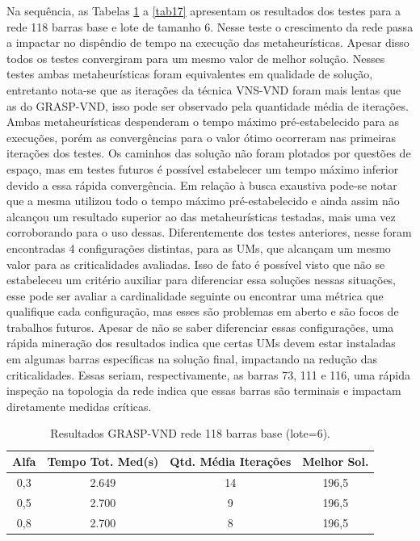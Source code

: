 \documentclass[12pt]{article}
\begin{document}
Na sequência, as Tabelas \ref{tab14} a \ref{tab17} apresentam os resultados dos testes para a rede 118 barras base e lote de tamanho 6. Nesse teste o crescimento da rede passa a impactar no dispêndio de tempo na execução das metaheurísticas. Apesar disso todos os testes convergiram para um mesmo valor de melhor solução. Nesses testes ambas metaheurísticas foram equivalentes em qualidade de solução, entretanto nota-se que as iterações da técnica VNS-VND foram mais lentas que as do GRASP-VND, isso pode ser observado pela quantidade média de iterações. Ambas metaheurísticas despenderam o tempo máximo pré-estabelecido para as execuções, porém as convergências para o valor ótimo ocorreram nas primeiras iterações dos testes. Os caminhos das solução não foram plotados por questões de espaço, mas em testes futuros é possível estabelecer um tempo máximo inferior devido a essa rápida convergência. Em relação à busca exaustiva pode-se notar que a mesma utilizou todo o tempo máximo pré-estabelecido e ainda assim não alcançou um resultado superior ao das metaheurísticas testadas, mais uma vez corroborando para o uso dessas. Diferentemente dos testes anteriores, nesse foram encontradas 4 configurações distintas, para as UMs, que alcançam um mesmo valor para as criticalidades avaliadas. Isso de fato é possível visto que não se estabeleceu um critério auxiliar para diferenciar essa soluções nessas situações, esse pode ser avaliar a cardinalidade seguinte ou encontrar uma métrica que qualifique cada configuração, mas esses são problemas em aberto e são focos de trabalhos futuros. Apesar de não se saber diferenciar essas configurações, uma rápida mineração dos resultados indica que certas UMs devem estar instaladas em algumas barras específicas na solução final, impactando na redução das criticalidades. Essas seriam, respectivamente, as barras 73, 111 e 116, uma rápida inspeção na topologia da rede indica que essas barras são terminais e impactam diretamente medidas críticas.
\begin{table}[H]
	\centering
	\caption{Resultados GRASP-VND rede 118 barras base (lote=6).}
	\begin{tabular}{|c|c|c|c|}
		\hline
		\textbf{Alfa} & \textbf{Tempo Tot. Med(s)} & \textbf{Qtd. Média Iterações} & \textbf{Melhor Sol.} \\
		\hline
		0,3   & 2.649 & 14    & 196,5 \\
		\hline
		0,5   & 2.700 & 9     & 196,5 \\
		\hline
		0,8   & 2.700 & 8     & 196,5 \\
		\hline
	\end{tabular}%
	\label{tab14}%
\end{table}%
\end{document}
